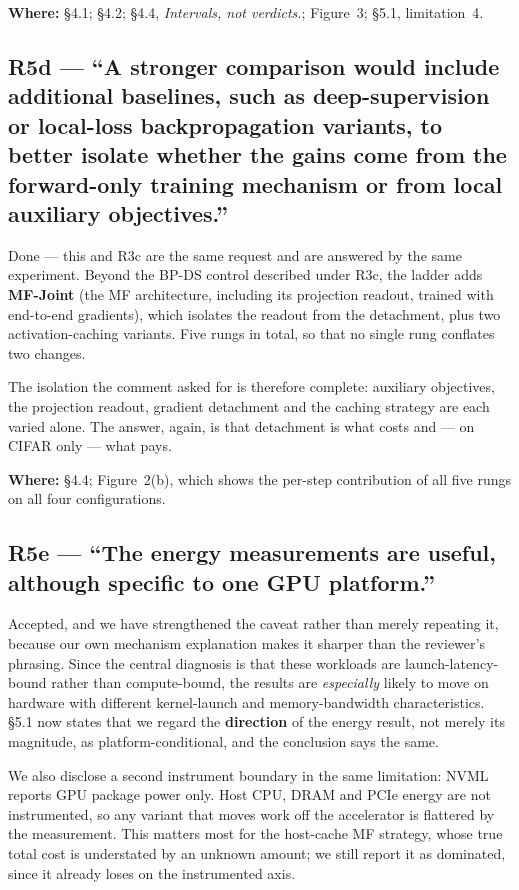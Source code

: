 \documentclass[11pt,a4paper]{article}
\newcommand{\MF}{MF}
\newcommand{\BPDS}{BP-DS}
\newcommand{\where}[1]{\par\smallskip\noindent\textbf{Where:} #1\par}
\begin{document}
\where{\S4.1; \S4.2; \S4.4, \emph{Intervals, not verdicts.}; Figure~3;
\S5.1, limitation~4.}

\subsection*{R5d --- ``A stronger comparison would include additional
baselines, such as deep-supervision or local-loss backpropagation variants, to
better isolate whether the gains come from the forward-only training mechanism
or from local auxiliary objectives.''}

Done --- this and R3c are the same request and are answered by the same
experiment. Beyond the \BPDS{} control described under R3c, the ladder adds
\textbf{\MF{}-Joint} (the \MF{} architecture, including its projection
readout, trained with end-to-end gradients), which isolates the readout from
the detachment, plus two activation-caching variants. Five rungs in total, so
that no single rung conflates two changes.

The isolation the comment asked for is therefore complete: auxiliary
objectives, the projection readout, gradient detachment and the caching
strategy are each varied alone. The answer, again, is that detachment is what
costs and --- on CIFAR only --- what pays.

\where{\S4.4; Figure~2(b), which shows the per-step contribution of all five
rungs on all four configurations.}

\subsection*{R5e --- ``The energy measurements are useful, although specific to
one GPU platform.''}

Accepted, and we have strengthened the caveat rather than merely repeating it,
because our own mechanism explanation makes it sharper than the reviewer's
phrasing. Since the central diagnosis is that these workloads are
launch-latency-bound rather than compute-bound, the results are
\emph{especially} likely to move on hardware with different kernel-launch and
memory-bandwidth characteristics. \S5.1 now states that we regard the
\textbf{direction} of the energy result, not merely its magnitude, as
platform-conditional, and the conclusion says the same.

We also disclose a second instrument boundary in the same limitation: NVML
reports GPU package power only. Host CPU, DRAM and PCIe energy are not
instrumented, so any variant that moves work off the accelerator is flattered
by the measurement. This matters most for the host-cache \MF{} strategy, whose
true total cost is understated by an unknown amount; we still report it as
dominated, since it already loses on the instrumented axis.
\end{document}
